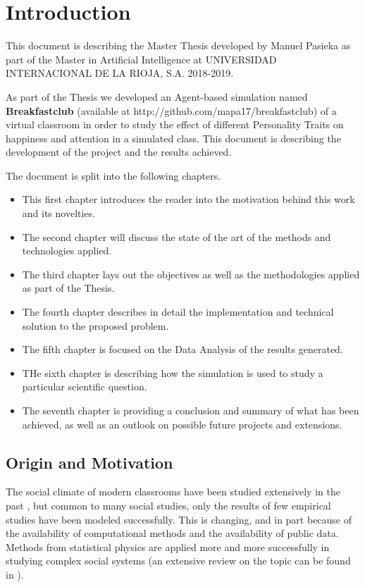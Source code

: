 \chapter{Introduction}
This document is describing the Master Thesis developed by Manuel Pasieka as part
of the Master in Artificial Intelligence at UNIVERSIDAD INTERNACIONAL DE LA RIOJA, S.A.
2018-2019. \par

\bb

As part of the Thesis we developed an Agent-based simulation named
\textbf{Breakfastclub} (available at http://github.com/mapa17/breakfastclub) of
a virtual classroom in order to study the effect of different Personality Traits
on happiness and attention in a simulated class. This document is describing the
development of the project and the results achieved.

\bb

The document is split into the following chapters.
\begin{itemize}
\item This first chapter introduces the reader into the motivation behind this work and
its novelties.
\item The second chapter will discuss the state of the art of the methods and technologies
applied.
\item The third chapter lays out the objectives as well as the methodologies applied
as part of the Thesis.
\item The fourth chapter describes in detail the implementation and technical solution
to the proposed problem.
\item The fifth chapter is focused on the Data Analysis of the results generated.
\item THe sixth chapter is describing how the simulation is used to study a particular
scientific question.
\item The seventh chapter is providing a conclusion and summary of what has been
achieved, as well as an outlook on possible future projects and extensions.
\end{itemize}

\section{Origin and Motivation}
The social climate of modern classrooms have been studied extensively in the past \cite{Anderson1982},
but common to many social studies, only the results of few empirical studies have been modeled
successfully. This is changing, and in part because of the availability of
computational methods and the availability of public data. Methods from statistical
physics are applied more and more successfully in studying complex social systems
(an extensive review on the topic can be found in \cite{Castellano2007}).

